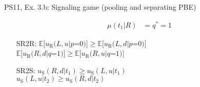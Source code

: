 \begin{frame}{PS11, Ex. 3.b: Signaling game (pooling and separating PBE)}
\begin{multicols}{2}
\begin{itemize}
\begin{align*}
          \mu(t_1|R)&=q^*=1
        \end{align*}
        \item[SR2R:] \vspace{-7pt}
                     $\mathbb{E}[u_\text{R}(L,u|p$=$0)]\geq\mathbb{E}[u_\text{R}(L,d|p$=$0)]$\\
                     $\mathbb{E}[u_\text{R}(R,d|q$=$1)]\geq \mathbb{E}[u_\text{R}(R,u|q$=$1)]$
        \item[SR2S:] \vspace{-1pt}$u_\text{S}(R,d|t_1)\geq u_\text{S}(L,u|t_1)$\\
                     $u_\text{S}(L,u|t_2)\geq u_\text{S}(R,d|t_2)$
      \end{itemize}
      \vfill\null \columnbreak
      \vfill
    \end{multicols}
\end{frame}
